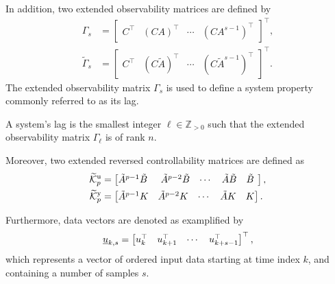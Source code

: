 In addition, two extended observability matrices are defined by
\begin{align*}
\Gamma_s &= \begin{bmatrix}C^\top & (CA)^\top & \cdots & (CA^{s-1})^\top\end{bmatrix}^\top,\\%
\widetilde{\Gamma}_s &= \begin{bmatrix}C^\top & (C\tilde{A})^\top & \cdots & (C\tilde{A}^{s-1})^\top\end{bmatrix}^\top.
\end{align*}
The extended observability matrix $\Gamma_s$ is used to define a system property commonly referred to as its lag.
\begin{defn}\label{def:lag}
    A system's lag is the smallest integer $\ell\in\mathbb{Z}_{>0}$ such that the extended observability matrix $\Gamma_\ell$ is of rank $n$.
\end{defn}

Moreover, two extended reversed controllability matrices are defined as 
\begin{align*}
\tKp{u} &= \begin{bmatrix} \tilde{A}^{p-1}\tilde{B}\:\, & \tilde{A}^{p-2}\tilde{B} & \cdots & \tilde{A}\tilde{B} & \tilde{B}\:\, \end{bmatrix},\\%
\tKp{y} &= \begin{bmatrix} \tilde{A}^{p-1}K & \tilde{A}^{p-2}K & \cdots & \tilde{A}K & K \end{bmatrix}.
\end{align*}

%
Furthermore, data vectors are denoted as examplified by
\begin{align*}
    \underline{u}_{k,s} = \begin{bmatrix} u_k^\top & u_{k+1}^\top & \cdots & u_{k+s-1}^\top\end{bmatrix}^\top,
\end{align*}
which represents a vector of ordered input data starting at time index $k$, and containing a number of samples $s$.

